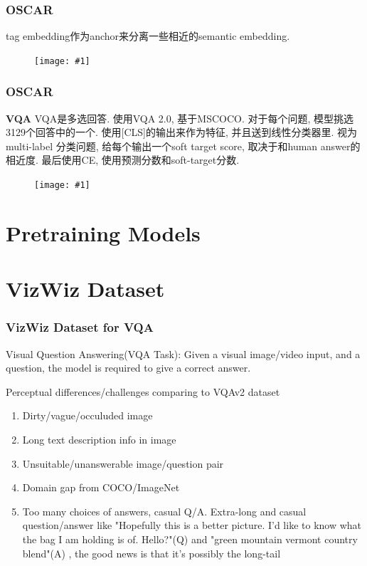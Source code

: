 \documentclass{beamer}
\newcommand{\cfig}[2]{
    \begin{figure}[htbp]
    \centering
    \texttt{[image: \#1]}
\end{figure}
}
\newcommand{\bt}[1]{\textbf{#1}}
\begin{document}
\begin{frame}
    \frametitle{OSCAR}

    tag embedding作为anchor来分离一些相近的semantic embedding.
    \cfig{OSCAR-arch.png}{1.0}


\end{frame}

\begin{frame}
    \frametitle{OSCAR}

    \bt{VQA}
    VQA是多选回答. 使用VQA 2.0, 基于MSCOCO. 对于每个问题, 模型挑选3129个回答中的一个. 使用[CLS]的输出来作为特征, 并且送到线性分类器里. 视为multi-label 分类问题, 给每个输出一个soft target score, 取决于和human answer的相近度. 最后使用CE, 使用预测分数和soft-target分数.
        
    \cfig{OSCAR-net.png}{0.9}

\end{frame}


\section{Pretraining Models}

\section{VizWiz Dataset}

\begin{frame}
    \frametitle{VizWiz Dataset for VQA}

    Visual Question Answering(VQA Task): Given a visual image/video input, and a question, the model is required to give a correct answer.

    Perceptual differences/challenges comparing to VQAv2 dataset 
    \begin{enumerate}
        \item Dirty/vague/occuluded image
        \item Long text description info in image
        \item Unsuitable/unanswerable image/question pair
        \item Domain gap from COCO/ImageNet
        \item Too many choices of answers, casual Q/A. Extra-long and casual question/answer like "Hopefully this is a better picture. I'd like to know what the bag I am holding is of. Hello?"(Q) and "green mountain vermont country blend"(A) , the good news is that it's possibly the long-tail
    \end{enumerate}


    

\end{frame}
\end{document}
